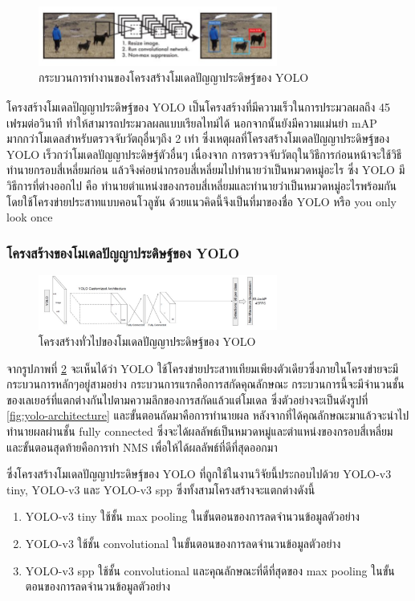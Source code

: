 \begin{figure}[!ht]
    \centering
    \includegraphics[width=0.7\textwidth]{chapter2/images/yolo.jpg}
    \caption{กระบวนการทำงานของโครงสร้างโมเดลปัญญาประดิษฐ์ของ YOLO}
    \label{fig:yolo}
\end{figure}

โครงสร้างโมเดลปัญญาประดิษฐ์ของ YOLO\textsuperscript{\cite{yolov3}} เป็นโครงสร้างที่มีความเร็วในการประมวลผลถึง 45 เฟรมต่อวินาที ทำให้สามารถประมวลผลแบบเรียลไทม์ได้ นอกจากนั้นยังมีความแม่นยำ mAP 
มากกว่าโมเดลสำหรับตรวจจับวัตถุอื่นๆถึง 2 เท่า ซึ่งเหตุผลที่โครงสร้างโมเดลปัญญาประดิษฐ์ของ YOLO เร็วกว่าโมเดลปัญญาประดิษฐ์ตัวอื่นๆ เนื่องจาก
การตรวจจับวัตถุในวิธีการก่อนหน้าจะใช้วิธีทำนายกรอบสี่เหลี่ยมก่อน แล้วจึงค่อยนำกรอบสี่เหลี่ยมไปทำนายว่าเป็นหมวดหมู่อะไร ซึ่ง YOLO มีวิธีการที่ต่างออกไป คือ 
ทำนายตำแหน่งของกรอบสี่เหลี่ยมและทำนายว่าเป็นหมวดหมู่อะไรพร้อมกัน โดยใช้โครงข่ายประสาทแบบคอนโวลูชัน ด้วยแนวคิดนี้จึงเป็นที่มาของชื่อ YOLO 
หรือ you only look once
\subsubsection*{โครงสร้างของโมเดลปัญญาประดิษฐ์ของ YOLO} 
\begin{figure}[!ht]
    \centering
    \includegraphics[width=0.7\textwidth]{chapter2/images/yolo_architecture.jpg}
    \caption{โครงสร้างทั่วไปของโมเดลปัญญาประดิษฐ์ของ YOLO}
    \label{fig:yolo_architecture}
\end{figure}

จากรูปภาพที่ \ref{fig:yolo_architecture} จะเห็นได้ว่า YOLO ใช้โครงข่ายประสาทเทียมเพียงตัวเดียวซึ่งภายในโครงข่ายจะมีกระบวนการหลักๆอยู่สามอย่าง 
กระบวนการแรกคือการสกัดคุณลักษณะ กระบวนการนี้จะมีจำนวนชั้นของเลเยอร์ที่แตกต่างกันไปตามความลึกของการสกัดแล้วแต่โมเดล ซึ่งตัวอย่างจะเป็นดังรูปที่ \ref{fig:yolo-architecture} 
และขั้นตอนถัดมาคือการทำนายผล หลังจากที่ได้คุณลักษณะมาแล้วจะนำไปทำนายผลผ่านชั้น fully connected ซึ่งจะได้ผลลัพธ์เป็นหมวดหมู่และตำแหน่งของกรอบสี่เหลี่ยม 
และขั้นตอนสุดท้ายคือการทำ NMS เพื่อให้ได้ผลลัพธ์ที่ดีที่สุดออกมา
\clearpage
\par ซึ่งโครงสร้างโมเดลปัญญาประดิษฐ์ของ YOLO ที่ถูกใช้ในงานวิจัยนี้ประกอบไปด้วย YOLO-v3 tiny, YOLO-v3 และ YOLO-v3 spp ซึ่งทั้งสามโครงสร้างจะแตกต่างดังนี้
\begin{enumerate}
	\setlength\itemsep{-0.25em}
	\item YOLO-v3 tiny ใช้ชั้น max pooling ในขั้นตอนของการลดจำนวนข้อมูลตัวอย่าง
	\item YOLO-v3 ใช้ชั้น convolutional ในขั้นตอนของการลดจำนวนข้อมูลตัวอย่าง
	\item YOLO-v3 spp ใช้ชั้น convolutional และคุณลักษณะที่ดีที่สุดของ max pooling ในขั้นตอนของการลดจำนวนข้อมูลตัวอย่าง
\end{enumerate}

